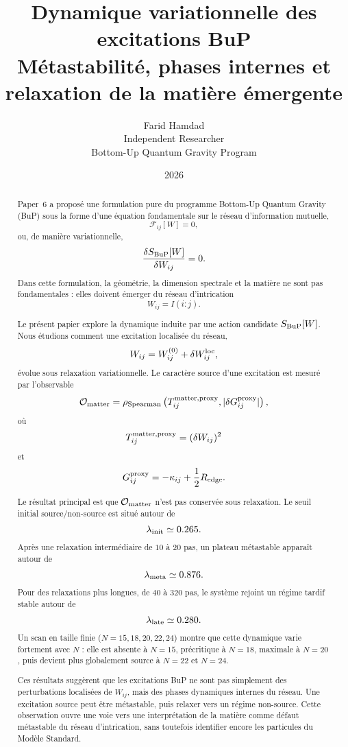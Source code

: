 \documentclass[11pt,a4paper]{article}
\title{
\textbf{Dynamique variationnelle des excitations BuP}\\[0.5em]
\large Métastabilité, phases internes et relaxation de la matière émergente}
\author{
Farid Hamdad\\
\small Independent Researcher\\
\small Bottom-Up Quantum Gravity Program
}
\date{2026}
\begin{document}
\maketitle

\begin{abstract}

Paper~6 a proposé une formulation pure du programme Bottom-Up Quantum Gravity
(BuP) sous la forme d'une équation fondamentale sur le réseau d'information
mutuelle,
\[
\mathcal{F}_{ij}[W]=0,
\]
ou, de manière variationnelle,
\[
\frac{\delta S_{\rm BuP}[W]}{\delta W_{ij}}=0.
\]
Dans cette formulation, la géométrie, la dimension spectrale et la matière ne
sont pas fondamentales : elles doivent émerger du réseau d'intrication
\[
W_{ij}=I(i:j).
\]

Le présent papier explore la dynamique induite par une action candidate
\(S_{\rm BuP}[W]\). Nous étudions comment une excitation localisée du réseau,
\[
W_{ij}=W_{ij}^{(0)}+\delta W_{ij}^{\rm loc},
\]
évolue sous relaxation variationnelle. Le caractère source d'une excitation
est mesuré par l'observable
\[
\mathcal{O}_{\rm matter}
=
\rho_{\rm Spearman}
\left(
T_{ij}^{\rm matter,proxy},
|\delta G_{ij}^{\rm proxy}|
\right),
\]
où
\[
T_{ij}^{\rm matter,proxy}=(\delta W_{ij})^2
\]
et
\[
G_{ij}^{\rm proxy}
=
-\kappa_{ij}+\frac12R_{\rm edge}.
\]

Le résultat principal est que \(\mathcal{O}_{\rm matter}\) n'est pas conservée
sous relaxation. Le seuil initial source/non-source est situé autour de
\[
\lambda_{\rm init}\simeq0.265.
\]
Après une relaxation intermédiaire de \(10\) à \(20\) pas, un plateau
métastable apparaît autour de
\[
\lambda_{\rm meta}\simeq0.876.
\]
Pour des relaxations plus longues, de \(40\) à \(320\) pas, le système rejoint
un régime tardif stable autour de
\[
\lambda_{\rm late}\simeq0.280.
\]
Un scan en taille finie (\(N=15,18,20,22,24\)) montre que cette dynamique
varie fortement avec \(N\) : elle est absente à \(N=15\), précritique à \(N=18\),
maximale à \(N=20\), puis devient plus globalement source à \(N=22\) et
\(N=24\).

Ces résultats suggèrent que les excitations BuP ne sont pas simplement des
perturbations localisées de \(W_{ij}\), mais des phases dynamiques internes du
réseau. Une excitation source peut être métastable, puis relaxer vers un
régime non-source. Cette observation ouvre une voie vers une interprétation de
la matière comme défaut métastable du réseau d'intrication, sans toutefois
identifier encore les particules du Modèle Standard.

\end{abstract}
\end{document}
